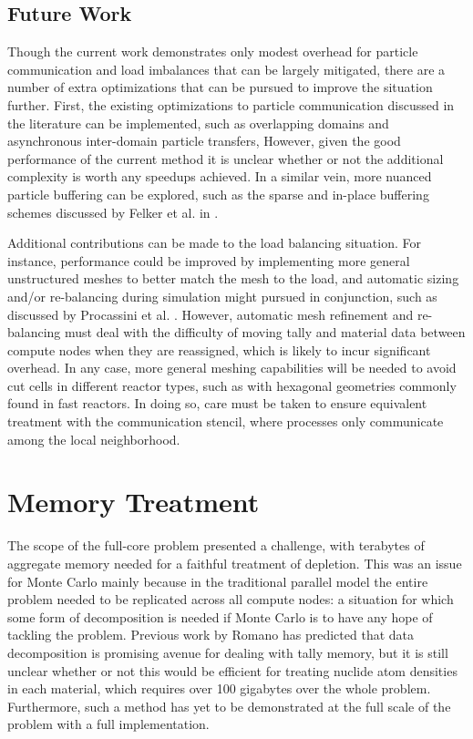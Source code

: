 \subsection{Future Work}

Though the current work demonstrates only modest overhead for particle
communication and load imbalances that can be largely mitigated, there are a
number of extra optimizations that can be pursued to improve the situation
further. First, the existing optimizations to particle communication discussed
in the literature can be implemented, such as overlapping domains and
asynchronous inter-domain particle transfers, However, given the good
performance of the current method it is unclear whether or not the additional
complexity is worth any speedups achieved. In a similar vein, more nuanced
particle buffering can be explored, such as the sparse and in-place buffering
schemes discussed by Felker et al. in \cite{Felker04062012}.

Additional contributions can be made to the load balancing situation. For
instance, performance could be improved by implementing more general unstructured
meshes to better match the mesh to the load, and automatic sizing and/or
re-balancing during simulation might pursued in conjunction, such as discussed by
Procassini et al. \cite{Procassini}. However, automatic mesh refinement and
re-balancing must deal with the difficulty of moving tally and material data
between compute nodes when they are reassigned, which is likely to incur
significant overhead. In any case, more general meshing capabilities will be
needed to avoid cut cells in different reactor types, such as with hexagonal
geometries commonly found in fast reactors. In doing so, care must be taken to
ensure equivalent treatment with the communication stencil, where processes only
communicate among the local neighborhood.

\section{Memory Treatment}

The scope of the full-core problem presented a challenge, with terabytes of
aggregate memory needed for a faithful treatment of depletion. This was an issue
for Monte Carlo mainly because in the traditional parallel model the entire
problem needed to be replicated across all compute nodes: a situation for which
some form of decomposition is needed if Monte Carlo is to have any hope of
tackling the problem. Previous work by Romano \cite{romano_thesis} has predicted
that data decomposition is promising avenue for dealing with tally memory, but
it is still unclear whether or not this would be efficient for treating nuclide
atom densities in each material, which requires over 100 gigabytes over the
whole problem. Furthermore, such a method has yet to be demonstrated at the full
scale of the problem with a full implementation.

